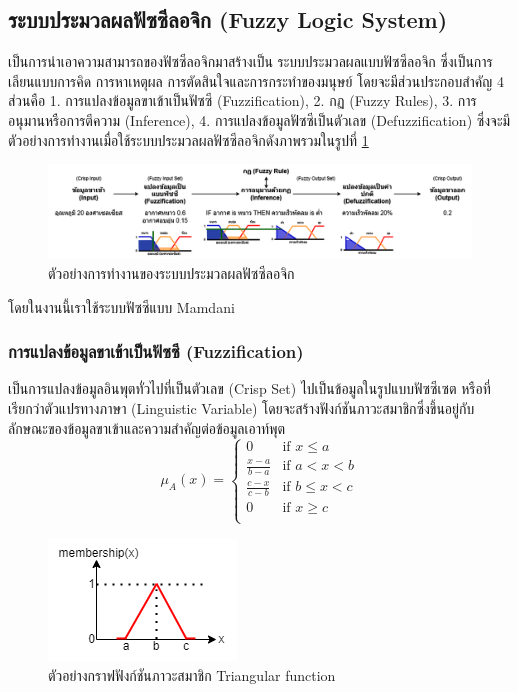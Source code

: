 \subsection{ระบบประมวลผลฟัซซีลอจิก (Fuzzy Logic System)}
เป็นการนำเอาความสามารถของฟัซซีลอจิกมาสร้างเป็น ระบบประมวลผลแบบฟัซซีลอจิก \cite{Kruse} ซึ่งเป็นการเลียนแบบการคิด การหาเหตุผล การตัดสินใจและการกระทำของมนุษย์ โดยจะมีส่วนประกอบสำคัญ 4 ส่วนคือ 1. การแปลงข้อมูลขาเข้าเป็นฟัซซี (Fuzzification), 2. กฏ (Fuzzy Rules), 3. การอนุมานหรือการตีความ (Inference), 4. การแปลงข้อมูลฟัซซีเป็นตัวเลข (Defuzzification)
ซึ่งจะมีตัวอย่างการทำงานเมื่อใช้ระบบประมวลผลฟัซซีลอจิกดังภาพรวมในรูปที่ \ref{fig:2}
\begin{figure}[ht]
    \centering
    \includegraphics[scale=0.375]{images/ex_fis.png}
    \caption{ตัวอย่างการทำงานของระบบประมวลผลฟัซซีลอจิก}
    \label{fig:2}
\end{figure}

โดยในงานนี้เราใช้ระบบฟัซซีแบบ Mamdani

\subsubsection{การแปลงข้อมูลขาเข้าเป็นฟัซซี (Fuzzification)}
เป็นการแปลงข้อมูลอินพุตทั่วไปที่เป็นตัวเลข (Crisp Set) ไปเป็นข้อมูลในรูปแบบฟัซซีเซต \cite{Sansanee} หรือที่เรียกว่าตัวแปรทางภาษา (Linguistic Variable) โดยจะสร้างฟังก์ชันภาวะสมาชิกซึ่งขึ้นอยู่กับลักษณะของข้อมูลขาเข้าและความสำคัญต่อข้อมูลเอาท์พุต
\begin{equation} \mu_A(x) = \begin{cases}
0 & \text{if } x \leq a \\
\frac{x-a}{b-a} & \text{if } a < x < b \\
\frac{c-x}{c-b} & \text{if } b \leq x < c \\
0 & \text{if } x \geq c \\
\end{cases} \end{equation}
\begin{figure}[ht]
    \centering
    \includegraphics[scale=0.7]{images/ex_memship.png}
    \caption{ตัวอย่างกราฟฟังก์ชันภาวะสมาชิก Triangular function}
    \label{fig:3}
\end{figure}

